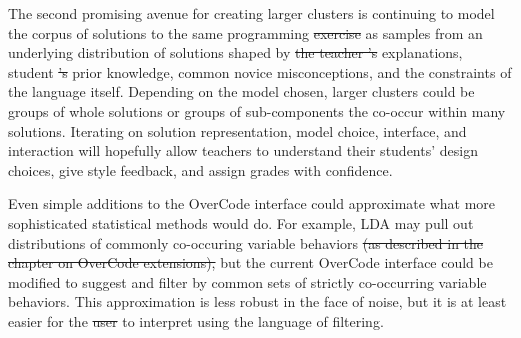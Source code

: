 \documentclass[12pt,twoside]{mitthesis}
\providecommand{\DIFaddtex}[1]{{\protect\color{blue}\uwave{#1}}} %
\providecommand{\DIFdeltex}[1]{{\protect\color{red}\sout{#1}}}                      %
\providecommand{\DIFaddbegin}{} %
\providecommand{\DIFaddend}{} %
\providecommand{\DIFdelbegin}{} %
\providecommand{\DIFdelend}{} %
\providecommand{\DIFadd}[1]{\texorpdfstring{\DIFaddtex{#1}}{#1}} %
\providecommand{\DIFdel}[1]{\texorpdfstring{\DIFdeltex{#1}}{}} %
\begin{document}
{{{{{{{{{{%
\DIFaddbegin 


\DIFaddend The second promising avenue for creating larger clusters is continuing to model the corpus of solutions to the same programming \DIFdelbegin \DIFdel{exercise }\DIFdelend \DIFaddbegin \DIFadd{problem }\DIFaddend as samples from an underlying distribution of solutions shaped by \DIFdelbegin \DIFdel{the teacher 's }\DIFdelend \DIFaddbegin \DIFadd{teacher }\DIFaddend explanations, student \DIFdelbegin \DIFdel{'s }\DIFdelend prior knowledge, common novice misconceptions, and the constraints of the language itself. Depending on the model chosen, larger clusters could be groups of whole solutions or groups of sub-components the co-occur within many solutions. Iterating on solution representation, model choice, interface, and interaction will hopefully allow teachers to understand their students' design choices, give style feedback, and assign grades with confidence. 

Even simple additions to the OverCode interface could approximate what more sophisticated statistical methods would do. For example, LDA may pull out distributions of commonly co-occuring variable behaviors \DIFdelbegin \DIFdel{(as described in the chapter on OverCode extensions), }\DIFdelend but the current OverCode interface could be modified to suggest and filter by common sets of strictly co-occurring variable behaviors. This approximation is less robust in the face of noise, but it is at least easier for the \DIFdelbegin \DIFdel{user }\DIFdelend \DIFaddbegin \DIFadd{teacher }\DIFaddend to interpret using the language of filtering. %

}}}}}}}}}}
\end{document}
